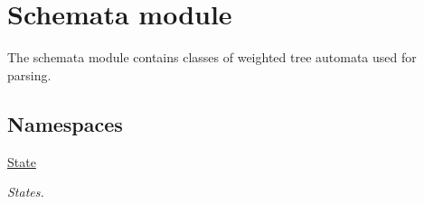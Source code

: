 \hypertarget{group__schemata}{}\section{Schemata module}
\label{group__schemata}


The {\ttfamily schemata} module contains classes of weighted tree automata used for parsing.  


\subsection*{Namespaces}
\begin{DoxyCompactItemize}
\item 
 \mbox{\hyperlink{namespaceState}{State}}
\begin{DoxyCompactList}\small\item\em States. \end{DoxyCompactList}\end{DoxyCompactItemize}
